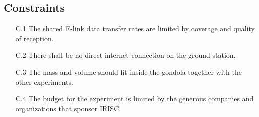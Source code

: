 \subsection{Constraints}

\begin{enumerate}
    \item[C.1] The shared E-link data transfer rates are limited by coverage and quality of reception. 
    \item[C.2] There shall be no direct internet connection on the ground station.
    \item[C.3] The mass and volume should fit inside the gondola together with the other experiments.
    \item[C.4] The budget for the experiment is limited by the generous companies and organizations that sponsor IRISC.
\end{enumerate}